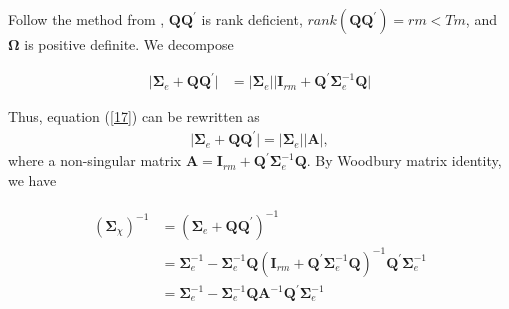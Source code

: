 \documentclass[12pt,a4paper,hyperref]{article}
\begin{document}
Follow the method from \citet{Hayakawa:2018}, $\boldsymbol{QQ}^{'} $ is rank deficient, $rank(\boldsymbol{QQ}^{'})=rm<Tm$, and $\boldsymbol{\Omega}$ is positive definite.  We decompose

\begin{align}
 \vert \boldsymbol{\Sigma}_{e}+\boldsymbol{Q}\boldsymbol{Q}^{'}  \vert &=   \vert \boldsymbol{\Sigma}_{e} \vert \vert \boldsymbol{I}_{rm}+\boldsymbol{Q}^{'}\boldsymbol{\Sigma}_{e}^{-1}\boldsymbol{Q} \vert  \label{17}
\end{align}

 Thus,  equation  (\ref{17}) can be rewritten as
\begin{align}
 \vert \boldsymbol{\Sigma}_{e}+\boldsymbol{Q}\boldsymbol{Q}^{'}  \vert =   \vert \boldsymbol{\Sigma}_{e}  \vert \vert \boldsymbol{A} \vert, \label{18}
\end{align}
where a non-singular matrix $\boldsymbol{A}=\boldsymbol{I}_{rm}+\boldsymbol{Q}^{'}\boldsymbol{\Sigma}_{e}^{-1}\boldsymbol{Q}$.
 By Woodbury matrix identity, we have

\begin{align}
\begin{split}
\left(\boldsymbol{\Sigma}_{\chi}\right)^{-1}&=\left(  \boldsymbol{\Sigma}_{e}+\boldsymbol{Q}\boldsymbol{Q}^{'} \right)^{-1} \\
&= \boldsymbol{\Sigma}_{e}^{-1}-\boldsymbol{\Sigma}_{e}^{-1}\boldsymbol{Q}\left( \boldsymbol{I}_{rm}+\boldsymbol{Q}^{'}\boldsymbol{\Sigma}_{e}^{-1}\boldsymbol{Q}  \right)^{-1}\boldsymbol{Q}^{'}\boldsymbol{\Sigma}_{e}^{-1} \\
&= \boldsymbol{\Sigma}_{e}^{-1}-\boldsymbol{\Sigma}_{e}^{-1}\boldsymbol{Q}\boldsymbol{A}^{-1}\boldsymbol{Q}^{'}\boldsymbol{\Sigma}_{e}^{-1}
\end{split}
\end{align}
\end{document}
